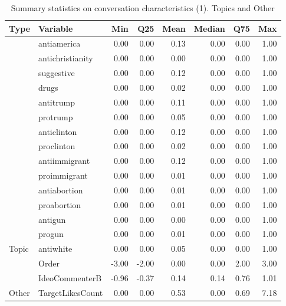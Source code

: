 \begin{table}[!h]
\centering
\caption{\label{tab:summ-tab-topics}Summary statistics on conversation characteristics (1). Topics and Other}
\centering
\begin{tabular}[t]{llrrrrrr}
\toprule
Type & Variable & Min & Q25 & Mean & Median & Q75 & Max\\
\midrule
 & antiamerica & 0.00 & 0.00 & 0.13 & 0.00 & 0.00 & 1.00\\
\cmidrule{2-8}
 & antichristianity & 0.00 & 0.00 & 0.00 & 0.00 & 0.00 & 1.00\\
\cmidrule{2-8}
 & suggestive & 0.00 & 0.00 & 0.12 & 0.00 & 0.00 & 1.00\\
\cmidrule{2-8}
 & drugs & 0.00 & 0.00 & 0.02 & 0.00 & 0.00 & 1.00\\
\cmidrule{2-8}
 & antitrump & 0.00 & 0.00 & 0.11 & 0.00 & 0.00 & 1.00\\
\cmidrule{2-8}
 & protrump & 0.00 & 0.00 & 0.05 & 0.00 & 0.00 & 1.00\\
\cmidrule{2-8}
 & anticlinton & 0.00 & 0.00 & 0.12 & 0.00 & 0.00 & 1.00\\
\cmidrule{2-8}
 & proclinton & 0.00 & 0.00 & 0.02 & 0.00 & 0.00 & 1.00\\
\cmidrule{2-8}
 & antiimmigrant & 0.00 & 0.00 & 0.12 & 0.00 & 0.00 & 1.00\\
\cmidrule{2-8}
 & proimmigrant & 0.00 & 0.00 & 0.01 & 0.00 & 0.00 & 1.00\\
\cmidrule{2-8}
 & antiabortion & 0.00 & 0.00 & 0.01 & 0.00 & 0.00 & 1.00\\
\cmidrule{2-8}
 & proabortion & 0.00 & 0.00 & 0.01 & 0.00 & 0.00 & 1.00\\
\cmidrule{2-8}
 & antigun & 0.00 & 0.00 & 0.00 & 0.00 & 0.00 & 1.00\\
\cmidrule{2-8}
 & progun & 0.00 & 0.00 & 0.01 & 0.00 & 0.00 & 1.00\\
\cmidrule{2-8}
\multirow{-15}{*}{\raggedright\arraybackslash Topic} & antiwhite & 0.00 & 0.00 & 0.05 & 0.00 & 0.00 & 1.00\\
\cmidrule{1-8}
 & Order & -3.00 & -2.00 & 0.00 & 0.00 & 2.00 & 3.00\\
\cmidrule{2-8}
 & IdeoCommenterB & -0.96 & -0.37 & 0.14 & 0.14 & 0.76 & 1.01\\
\cmidrule{2-8}
\multirow{-3}{*}{\raggedright\arraybackslash Other} & TargetLikesCount & 0.00 & 0.00 & 0.53 & 0.00 & 0.69 & 7.18\\
\bottomrule
\end{tabular}
\end{table}
